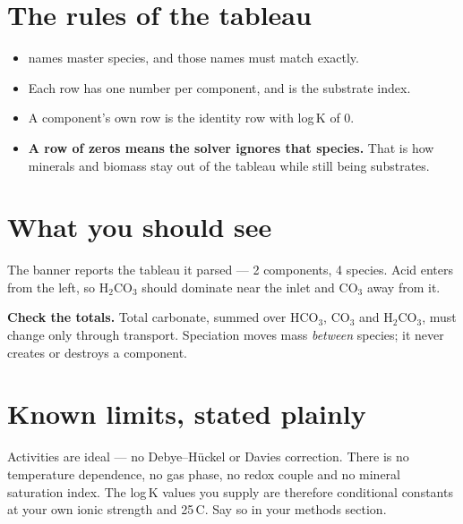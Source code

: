 \section{The rules of the tableau}

\begin{itemize}[leftmargin=1.2em]
\item {} names master species, and those names must match
 exactly.
\item Each  row has one number per component, and  is the
substrate index.
\item A component's own row is the identity row with log\,K of 0.
\item \textbf{A row of zeros means the solver ignores that species.} That is
how minerals and biomass stay out of the tableau while still being substrates.
\end{itemize}

\section{What you should see}

The banner reports the tableau it parsed --- 2 components, 4 species. Acid
enters from the left, so H$_2$CO$_3$ should dominate near the inlet and CO$_3$
away from it.

\begin{cbnote}
\textbf{\color{cbTeal}Check the totals.}\quad
Total carbonate, summed over HCO$_3$, CO$_3$ and H$_2$CO$_3$, must change only
through transport. Speciation moves mass \emph{between} species; it never
creates or destroys a component.
\end{cbnote}


\section{Known limits, stated plainly}

Activities are ideal --- no Debye--H\"uckel or Davies correction. There is no
temperature dependence, no gas phase, no redox couple and no mineral saturation
index. The log\,K values you supply are therefore conditional constants at your
own ionic strength and 25\,\textdegree C. Say so in your methods section.

